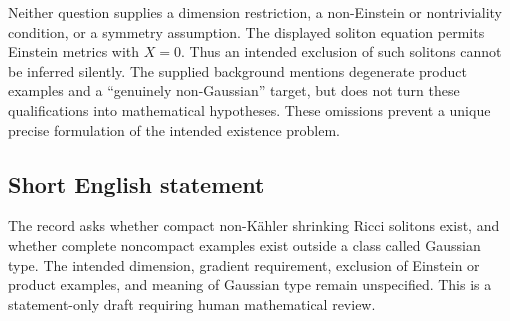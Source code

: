 \documentclass[11pt]{article}
\begin{document}
Neither question supplies a dimension restriction, a non-Einstein or nontriviality condition, or a symmetry assumption. The displayed soliton equation permits Einstein metrics with \(X=0\). Thus an intended exclusion of such solitons cannot be inferred silently. The supplied background mentions degenerate product examples and a ``genuinely non-Gaussian'' target, but does not turn these qualifications into mathematical hypotheses. These omissions prevent a unique precise formulation of the intended existence problem.
\subsection{Short English statement}
The record asks whether compact non-K\"ahler shrinking Ricci solitons exist, and whether complete noncompact examples exist outside a class called Gaussian type. The intended dimension, gradient requirement, exclusion of Einstein or product examples, and meaning of Gaussian type remain unspecified. This is a statement-only draft requiring human mathematical review.
\end{document}
